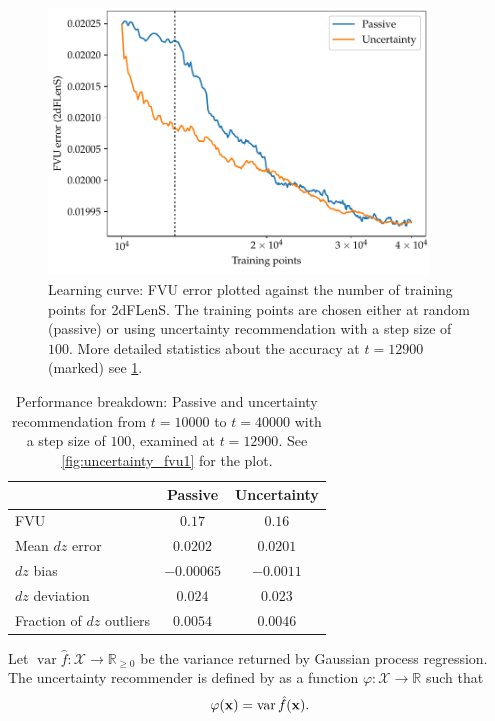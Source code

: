 \documentclass[11pt,twoside,openright]{report}
\newcommand\bbR{\mathbb{R}}
\newcommand\bx{\mathbf{x}}
\newcommand\cX{\mathcal{X}}
\DeclareMathOperator{\var}{var}
\begin{document}
  \begin{figure}
    \centering
    \includegraphics[width=0.9\textwidth]{dflens_dz_uncertainty_many.pdf}
    \caption{Learning curve: FVU error plotted against the number of training points for 2dFLenS. The training points are chosen either at random (passive) or using uncertainty recommendation with a step size of $100$. More detailed statistics about the accuracy at $t=12900$ (marked) see \cref{table:uncertainty-breakdown}.}
    \label{fig:dflens_dz_uncertainty_many}
  \end{figure}


  \begin{table}
  \centering

  \begin{tabular}{l | c c}
      & Passive & Uncertainty  \\
      \hline
      FVU & $0.17$ & $0.16$ \\
      Mean $dz$ error & $0.0202$ & $0.0201$ \\
      $dz$ bias & $-0.00065$ & $-0.0011$ \\
      $dz$ deviation & $0.024$ & $0.023$ \\
      Fraction of $dz$ outliers & $0.0054$ & $0.0046$
    \end{tabular}

  \caption{Performance breakdown: Passive and uncertainty recommendation from $t=10000$ to $t=40000$ with a step size of $100$, examined at $t=12900$. See \cref{fig:uncertainty_fvu1} for the plot.}
  \label{table:uncertainty-breakdown}
  \end{table}

Let $\var\hat f : \cX \to \bbR_{\geq0}$ be the variance returned by Gaussian process regression. The uncertainty recommender is defined by \citep{GPActiveLearning} as a function $\varphi : \cX \to \bbR$ such that \[
    \varphi(\bx) = \var\hat f(\bx) \text.
\]
\end{document}
